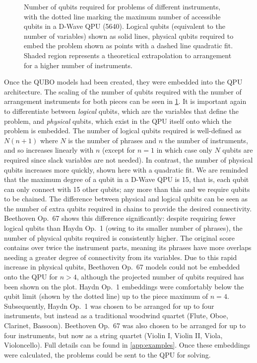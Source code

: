\documentclass[12pt]{article}
\theoremstyle{definition}
\begin{document}
\begin{figure}[!t]
    \centering\footnotesize
    
    \caption{Number of qubits required for problems of different instruments, with the dotted line marking the maximum number of accessible qubits in a D-Wave QPU (\num{5640}). Logical qubits (equivalent to the number of variables) shown as solid lines, physical qubits required to embed the problem shown as points with a dashed line quadratic fit. Shaded region represents a theoretical extrapolation to arrangement for a higher number of instruments.}
    \label{fig:qubits}
\end{figure}

Once the QUBO models had been created, they were embedded into the QPU architecture. The scaling of the number of qubits required with the number of arrangement instruments for both pieces can be seen in \cref{fig:qubits}. It is important again to differentiate between \emph{logical} qubits, which are the variables that define the problem, and \emph{physical} qubits, which exist in the QPU itself onto which the problem is embedded. The number of logical qubits required is well-defined as $N(n+1)$ where $N$ is the number of phrases and $n$ the number of instruments, and so increases linearly with $n$ (except for $n=1$ in which case only $N$ qubits are required since slack variables are not needed). In contrast, the number of physical qubits increases more quickly, shown here with a quadratic fit. We are reminded that the maximum degree of a qubit in a D-Wave QPU is \num{15}, that is, each qubit can only connect with \num{15} other qubits; any more than this and we require qubits to be chained. The difference between physical and logical qubits can be seen as the number of extra qubits required in chains to provide the desired connectivity. Beethoven Op.\ 67 shows this difference significantly: despite requiring fewer logical qubits than Haydn Op.\ 1 (owing to its smaller number of phrases), the number of physical qubits required is consistently higher. The original score contains over twice the instrument parts, meaning its phrases have more overlaps needing a greater degree of connectivity from its variables. Due to this rapid increase in physical qubits, Beethoven Op.\ 67 models could not be embedded onto the QPU for $n>4$, although the projected number of qubits required has been shown on the plot. Haydn Op.\ 1 embeddings were comfortably below the qubit limit (shown by the dotted line) up to the piece maximum of $n=4$. Subsequently, Haydn Op.\ 1 was chosen to be arranged for up to four instruments, but instead as a traditional woodwind quartet (Flute, Oboe, Clarinet, Bassoon). Beethoven Op.\ 67 was also chosen to be arranged for up to four instruments, but now as a string quartet (Violin I, Violin II, Viola, Violoncello). Full details can be found in \cref{app:examples}. Once these embeddings were calculated, the problems could be sent to the QPU for solving.
\end{document}
